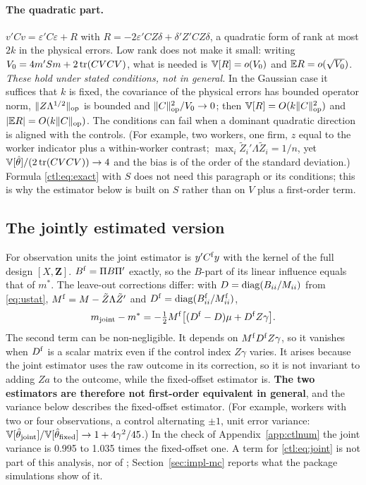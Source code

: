 \paragraph{The quadratic part.} $v'Cv=\varepsilon'C\varepsilon+R$ with $R=-2\varepsilon'CZ\delta+\delta'Z'CZ\delta$,
a quadratic form of rank at most $2k$ in the physical errors. Low rank does not make it small: writing
$V_0=4m'Sm+2\operatorname{tr}(CVCV)$, what is needed is $\mathbb{V}[R]=o(V_0)$ and $\mathbb{E} R=o(\sqrt{V_0})$. \emph{These hold under
stated conditions, not in general.} In the Gaussian case it suffices that $k$ is fixed, the covariance of the
physical errors has bounded operator norm, $\|Z\Lambda^{1/2}\|_{\mathrm{op}}$ is bounded and $\|C\|_{\mathrm{op}}^2/V_0\to0$; then
$\mathbb{V}[R]=O(k\|C\|_{\mathrm{op}}^2)$ and $|\mathbb{E} R|=O(k\|C\|_{\mathrm{op}})$. The conditions can fail when a dominant quadratic direction is
aligned with the controls. (For example, two workers, one firm, $z$ equal to the worker indicator
plus a within-worker contrast; $\max_i\tilde Z_i'\Lambda\tilde Z_i=1/n$, yet $\mathbb{V}[\hat\theta]/(2\operatorname{tr}(CVCV))\to4$
and the bias is of the order of the standard deviation.) Formula \eqref{ctl:eq:exact} with $S$ does not need this
paragraph or its conditions; this is why the estimator below is built on $S$ rather than on $V$ plus a
first-order term.

\subsection{The jointly estimated version}\label{ctl:joint}

For observation units the joint estimator is $y'C^{\rm f}y$ with the kernel of the full design $[X,\mathbf Z]$.
$B^{\rm f}=\Pi B\Pi'$ exactly, so the $B$-part of its linear influence equals that of $m^*$.  The
leave-out corrections differ: with $D=\operatorname{diag}(B_{ii}/M_{ii})$ from \eqref{eq:ustat},
$M^{\rm f}=M-\tilde Z\Lambda\tilde Z'$ and $D^{\rm f}=\operatorname{diag}(B^{\rm f}_{ii}/M^{\rm f}_{ii})$,
\begin{equation}\label{ctl:eq:joint}
 m_{\rm joint}-m^*=-\tfrac12M^{\rm f}\bigl[(D^{\rm f}-D)\mu+D^{\rm f}Z\gamma\bigr].
\end{equation}
The second term can be non-negligible. It depends on $M^{\rm f}D^{\rm f}Z\gamma$, so it vanishes when $D^{\rm f}$ is
a scalar matrix even if the control index $Z\gamma$ varies. It arises because the joint estimator uses the raw
outcome in its correction, so it is not invariant to adding $Za$ to the outcome, while the fixed-offset estimator
is. \textbf{The two estimators are therefore not first-order equivalent in general}, and the variance below
describes the fixed-offset estimator. (For example, workers with two or four observations, a
control alternating $\pm1$, unit error variance: $\mathbb{V}[\hat\theta_{\rm joint}]/\mathbb{V}[\hat\theta_{\rm fixed}]\to1+4\gamma^2/45$.)
In the check of Appendix~\ref{app:ctlnum} the joint variance is 0.995 to 1.035 times the fixed-offset one. A term
for \eqref{ctl:eq:joint} is not part of this analysis, nor of \fevc; Section~\ref{sec:impl-mc} reports what
the package simulations show of it.

